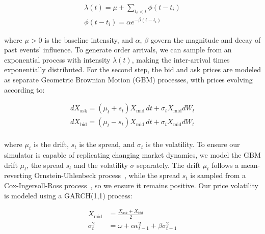 \documentclass[11pt]{article}
\begin{document}
    \begin{equation}
        \begin{aligned}
            \lambda(t) = \mu + \sum_{t_i < t} \phi(t - t_i)\\
            \phi(t - t_i) = \alpha e^{-\beta(t - t_i)}
        \end{aligned}
        \label{eq:hawkes}
    \end{equation}

    where \( \mu > 0 \) is the baseline intensity, and \( \alpha \), \( \beta \) govern the magnitude and decay of past events' influence.
    To generate order arrivals, we can sample from an exponential process with intensity \( \lambda(t) \),
    making the inter-arrival times exponentially distributed.
    For the second step, the bid and ask prices are modeled as separate Geometric Brownian Motion (GBM) processes, with prices evolving according to:

    \begin{gather*}
        dX_{\text{ask}} = (\mu_t + s_t) X_{\text{mid}} \, dt + \sigma_t X_{\text{mid}} dW_t\\
        dX_{\text{bid}} = (\mu_t - s_t) X_{\text{mid}} \, dt + \sigma_t X_{\text{mid}} dW_t\\
    \end{gather*}

    where \( \mu_t \) is the drift, \( s_t \) is the spread, and \(  \sigma_t \) is the volatility.
    To ensure our simulator is capable of replicating changing market dynamics,
    we model the GBM drift $\mu_t$, the spread $s_t$ and the volatility $\sigma$ separately.
    The drift \( \mu_t \) follows a mean-reverting Ornstein-Uhlenbeck process~\citep{Uhlenbeck1930},
    while the spread \( s_t \) is sampled from a Cox-Ingersoll-Ross process~\citep{Cox1985}, so we ensure it remains positive.
    Our price volatility is modeled using a GARCH(1,1) process:

    \begin{equation*}
        \begin{aligned}
            X_{\text{mid}} &= \frac{X_{\text{ask}} + X_{\text{bid}}}{2} \\
            \sigma_t^2 &= \omega + \alpha \epsilon_{t-1}^2 + \beta \sigma_{t-1}^2
        \end{aligned}
    \end{equation*}
\end{document}
